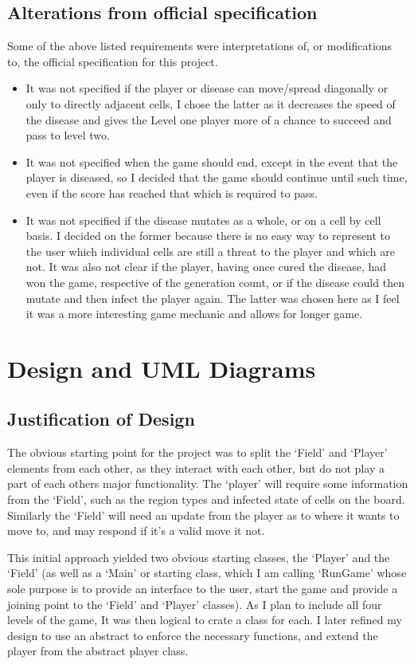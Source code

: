 \documentclass[pdftex,12pt,a4paper]{article}
\begin{document}
		\subsection{Alterations from official specification}
		Some of the above listed requirements were interpretations of, or modifications to, the official specification for this project.
		\begin{itemize}
			\item It was not specified if the player or disease can move/spread diagonally or only to directly adjacent cells, I chose the latter as it decreases the speed of the disease and gives the Level one player more of a chance to succeed and pass to level two.
			\item It was not specified when the game should end, except in the event that the player is diseased, so I decided that the game should continue until such time, even if the score has reached that which is required to pass.
			\item It was not specified if the disease mutates as a whole, or on a cell by cell basis. I decided on the former because there is no easy way to represent to the user which individual cells are still a threat to the player and which are not. It was also not clear if the player, having once cured the disease, had won the game, respective of the generation count, or if the disease could then mutate and then infect the player again. The latter was chosen here as I feel it was a more interesting game mechanic and allows for longer game.
		\end{itemize}
	\section{Design and UML Diagrams}
		\subsection{Justification of Design}
		The obvious starting point for the project was to split the `Field' and `Player' elements from each other, as they interact with each other, but do not play a part of each others major functionality. The `player' will require some information from the `Field', such as the region types and infected state of cells on the board. Similarly the `Field' will need an update from the player as to where it wants to move to, and may respond if it's a valid move it not.

		This initial approach yielded two obvious starting classes, the `Player' and the `Field' (as well as a `Main' or starting class, which I am calling `RunGame' whose sole purpose is to provide an interface to the user, start the game and provide a joining point to the `Field' and `Player' classes). As I plan to include all four levels of the game, It was then logical to crate a class for each. I later refined my design to use an abstract to enforce the necessary functions, and extend the player from the abstract player class.
\end{document}
